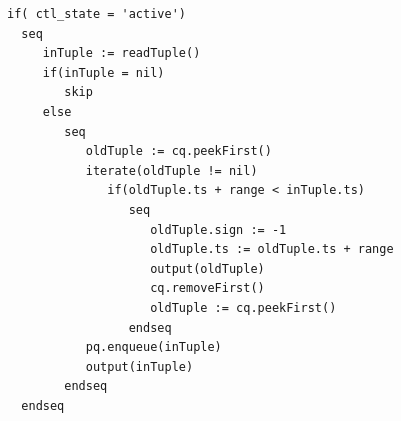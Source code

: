 \lstset{language=AbStM,showstringspaces=false}
\begin{lstlisting}[caption={ASM specification for the time-based window},label=TimeWindowListing]
if( ctl_state = 'active')
  seq
     inTuple := readTuple()
     if(inTuple = nil)
        skip
     else
        seq
           oldTuple := cq.peekFirst()
           iterate(oldTuple != nil)
              if(oldTuple.ts + range < inTuple.ts)
                 seq
                    oldTuple.sign := -1
                    oldTuple.ts := oldTuple.ts + range
                    output(oldTuple)
                    cq.removeFirst()
                    oldTuple := cq.peekFirst()
                 endseq
           pq.enqueue(inTuple)
           output(inTuple)
        endseq
  endseq
\end{lstlisting}







		











